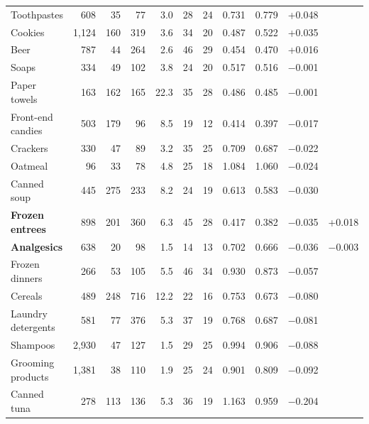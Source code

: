 \begin{table}[t]
\begin{tabular}{lrrrrrrrrrr}
Toothpastes & 608 & 35 & 77 & 3.0 & 28 & 24 & 0.731 & 0.779 & +0.048 &  \\
Cookies & 1,124 & 160 & 319 & 3.6 & 34 & 20 & 0.487 & 0.522 & +0.035 &  \\
Beer & 787 & 44 & 264 & 2.6 & 46 & 29 & 0.454 & 0.470 & +0.016 &  \\
Soaps & 334 & 49 & 102 & 3.8 & 24 & 20 & 0.517 & 0.516 & $-$0.001 &  \\
Paper towels & 163 & 162 & 165 & 22.3 & 35 & 28 & 0.486 & 0.485 & $-$0.001 &  \\
Front-end candies & 503 & 179 & 96 & 8.5 & 19 & 12 & 0.414 & 0.397 & $-$0.017 &  \\
Crackers & 330 & 47 & 89 & 3.2 & 35 & 25 & 0.709 & 0.687 & $-$0.022 &  \\
Oatmeal & 96 & 33 & 78 & 4.8 & 25 & 18 & 1.084 & 1.060 & $-$0.024 &  \\
Canned soup & 445 & 275 & 233 & 8.2 & 24 & 19 & 0.613 & 0.583 & $-$0.030 &  \\
\textbf{Frozen entrees} & 898 & 201 & 360 & 6.3 & 45 & 28 & 0.417 & 0.382 & $-$0.035 & +0.018 \\
\textbf{Analgesics} & 638 & 20 & 98 & 1.5 & 14 & 13 & 0.702 & 0.666 & $-$0.036 & $-$0.003 \\
Frozen dinners & 266 & 53 & 105 & 5.5 & 46 & 34 & 0.930 & 0.873 & $-$0.057 &  \\
Cereals & 489 & 248 & 716 & 12.2 & 22 & 16 & 0.753 & 0.673 & $-$0.080 &  \\
Laundry detergents & 581 & 77 & 376 & 5.3 & 37 & 19 & 0.768 & 0.687 & $-$0.081 &  \\
Shampoos & 2,930 & 47 & 127 & 1.5 & 29 & 25 & 0.994 & 0.906 & $-$0.088 &  \\
Grooming products & 1,381 & 38 & 110 & 1.9 & 25 & 24 & 0.901 & 0.809 & $-$0.092 &  \\
Canned tuna & 278 & 113 & 136 & 5.3 & 36 & 19 & 1.163 & 0.959 & $-$0.204 &  \\
\bottomrule
\end{tabular}
\end{table}
